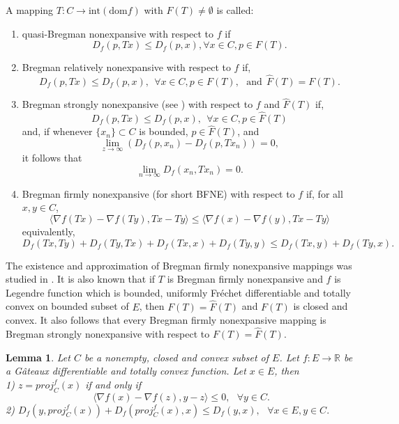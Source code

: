 \documentclass[reqno,b5paper]{amsart}
\theoremstyle{plain}
\newtheorem{lemma}[theorem]{Lemma}
\theoremstyle{definition}
\numberwithin{equation}{section}
\numberwithin{equation}{section}
\begin{document}
A mapping $T:C\to\text{int}(\text{dom} f)$ with $F(T)\neq\emptyset$ is called:
\begin{enumerate}
\item quasi-Bregman nonexpansive \cite{rei} with respect to $f$ if 
$$D_{f}(p,Tx)\leq D_{f}(p,x), \forall x\in C, p\in F(T).$$
\item
Bregman relatively nonexpansive \cite{rei} with respect to $f$ if,
$$ D_{f}(p,Tx)\leq D_{f}(p,x), \ \ \forall x\in C, p\in F(T), \ \ \ \text{and} \ \ \widehat{F}(T)=F(T).  $$
\item
Bregman strongly nonexpansive (see \cite{bru,rei}) with respect to $f$ and $\widehat{F}(T)$ if,
$$ D_{f}(p,Tx)\leq D_{f}(p,x), \ \ \forall x\in C, p\in \widehat{F}(T) $$
and, if whenever $\{x_{n}\}\subset C$ is bounded, $p\in \widehat{F}(T)$, and 
$$\lim_{z\to\infty}(D_{f}(p,x_{n})-D_{f}(p,Tx_{n}))=0,$$
it follows that 
$$\lim_{n\to\infty} D_{f}(x_{n},Tx_{n})=0.$$
\item
Bregman firmly nonexpansive (for short BFNE) with respect to $f$ if, for all $x,y\in C$,
$$\langle \nabla f(Tx)-\nabla f(Ty),Tx-Ty\rangle \leq \langle \nabla f(x)-\nabla f(y),Tx-Ty\rangle$$
equivalently,
\begin{equation}\label{5}
D_{f}(Tx,Ty)+D_{f}(Ty,Tx)+D_{f}(Tx,x)+D_{f}(Ty,y)\leq D_{f}(Tx,y)+D_{f}(Ty,x).
\end{equation}
\end{enumerate}
The existence and approximation of Bregman firmly nonexpansive mappings was studied in \cite{rei2}. It is also known that if $T$ is Bregman firmly nonexpansive and $f$ is Legendre function which is bounded, uniformly Fr\'{e}chet differentiable and totally convex on bounded subset of $E$, then $F(T)=\widehat{F}(T)$ and $F(T)$ is closed and convex. It also follows that every Bregman firmly nonexpansive mapping is Bregman strongly nonexpansive with respect to $F(T)=\widehat{F}(T)$.

\begin{lemma}\label{niaz}\cite{but}
Let $C$ be a nonempty, closed  and convex subset of $E$. Let $f:E\to \mathbb{R}$ be a G\^{a}teaux differentiable and totally convex function. Let $x\in E$, then \\
1) $z=proj_{C}^{f}(x)$ if and only if 
$$\langle \nabla f(x)-\nabla f(z),y-z\rangle \leq 0, \ \ \ \forall y\in C.$$
2)
 $D_{f}(y,proj_{C}^{f}(x))+D_{f}(proj_{C}^{f}(x),x)\leq D_{f}(y,x),  \ \ \ \forall x\in E, y\in C.$
\end{lemma}
\end{document}
